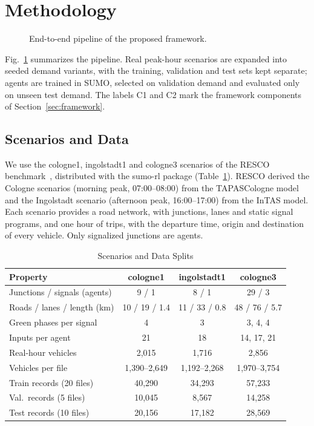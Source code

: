 \section{Methodology}
\label{sec:method}

\begin{figure}[t]
  \centering
  \resizebox{\textwidth}{!}{}
  \caption{End-to-end pipeline of the proposed framework.}
  \label{fig:pipeline}
\end{figure}

Fig.~\ref{fig:pipeline} summarizes the pipeline. Real peak-hour scenarios are expanded into seeded demand variants, with the training, validation and test sets kept separate; agents are trained in SUMO, selected on validation demand and evaluated only on unseen test demand. The labels C1 and C2 mark the framework components of Section~\ref{sec:framework}.

\subsection{Scenarios and Data}
We use the cologne1, ingolstadt1 and cologne3 scenarios of the RESCO benchmark~\cite{ault2021resco}, distributed with the sumo-rl package (Table~\ref{tab:scenarios}). RESCO derived the Cologne scenarios (morning peak, 07:00--08:00) from the TAPASCologne model and the Ingolstadt scenario (afternoon peak, 16:00--17:00) from the InTAS model. Each scenario provides a road network, with junctions, lanes and static signal programs, and one hour of trips, with the departure time, origin and destination of every vehicle. Only signalized junctions are agents.

\begin{table}[t]
\caption{Scenarios and Data Splits}
\label{tab:scenarios}
\centering
\footnotesize
\setlength{\tabcolsep}{3pt}
\begin{tabular}{|l|c|c|c|}
\hline
\textbf{Property} & \textbf{cologne1} & \textbf{ingolstadt1} & \textbf{cologne3} \\
\hline
Junctions / signals (agents) & 9 / 1 & 8 / 1 & 29 / 3 \\
\hline
Roads / lanes / length (km)  & 10 / 19 / 1.4 & 11 / 33 / 0.8 & 48 / 76 / 5.7 \\
\hline
Green phases per signal & 4 & 3 & 3, 4, 4 \\
\hline
Inputs per agent        & 21 & 18 & 14, 17, 21 \\
\hline
Real-hour vehicles      & 2{,}015 & 1{,}716 & 2{,}856 \\
\hline
Vehicles per file       & 1{,}390--2{,}649 & 1{,}192--2{,}268 & 1{,}970--3{,}754 \\
\hline
Train records (20 files) & 40{,}290 & 34{,}293 & 57{,}233 \\
\hline
Val.\ records (5 files)  & 10{,}045 & 8{,}567 & 14{,}258 \\
\hline
Test records (10 files)  & 20{,}156 & 17{,}182 & 28{,}569 \\
\hline
\end{tabular}
\end{table}

